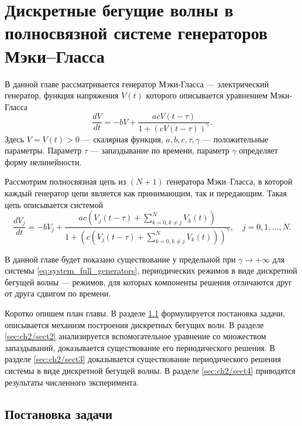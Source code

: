 \chapter{Дискретные бегущие волны в полносвязной системе генераторов Мэки--Гласса}\label{ch:ch2}

В данной главе рассматривается генератор Мэки-Гласса --- электрический генератор, функция напряжения $V(t)$ которого описывается уравнением Мэки-Гласса
%
\begin{equation}
	\label{eq:mg:ch3}
	\dfrac{d V}{dt}=
	- bV+\dfrac{acV(t - \tau) }{1 + (cV(t - \tau))^{\gamma}}.
\end{equation}
%
Здесь $V=V(t) > 0$ --- скалярная функция, $a, b, c, \tau, \gamma$ --- положительные параметры. Параметр $\tau$ --- запаздывание по времени, параметр $\gamma$ определяет форму нелинейности.

Рассмотрим полносвязная цепь из $(N + 1)$ генератора Мэки--Гласса, в которой каждый генератор цепи является как принимающим, так и передающим. Такая цепь описывается системой
\small
\begin{equation}
	\label{eq:system_full_generators}
	\dfrac{d V_{j}}{dt}=- bV_{j} + \dfrac{ac\left(V_{j}(t - \tau) + \sum\limits_{k = 0, k\neq j}^{N}V_{k}(t)\right)}{1 + \left(c\left(V_{j}(t - \tau) + \sum\limits_{k = 0, k\neq j}^{N}V_{k}(t)\right)\right)^{\gamma}}, \quad j=0,1,\ldots,N.
\end{equation}
\normalsize

В данной главе будет показано существование у предельной при $\gamma \to +\infty$ для системы \eqref{eq:system_full_generators}, периодических режимов в виде дискретной бегущей волны --- режимов, для которых компоненты решения отличаются друг от друга сдвигом по времени.

Коротко опишем план главы. В разделе \ref{sec:ch2/sect1} формулируется постановка задачи, описывается механизм построения дискретных бегущих волн. В разделе \ref{sec:ch2/sect2} анализируется вспомогательное уравнение со множеством запаздываний, доказывается существование его периодического решения. В разделе \ref{sec:ch2/sect3} доказывается существование периодического решения системы в виде дискретной бегущей волны. В разделе \ref{sec:ch2/sect4} приводятся результаты численного эксперимента.

\section{Постановка задачи}\label{sec:ch2/sect1}

